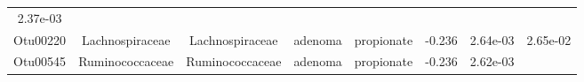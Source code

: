 \documentclass[11pt,]{article}
\begin{document}
\begin{longtable}[]{@{}cccccccc@{}}
\begin{minipage}[t]{0.08\columnwidth}
2.37e-03\strut
\end{minipage}\tabularnewline
\begin{minipage}[t]{0.08\columnwidth}\centering\strut
Otu00220\strut
\end{minipage} & \begin{minipage}[t]{0.15\columnwidth}\centering\strut
Lachnospiraceae\strut
\end{minipage} & \begin{minipage}[t]{0.15\columnwidth}\centering\strut
Lachnospiraceae\strut
\end{minipage} & \begin{minipage}[t]{0.08\columnwidth}\centering\strut
adenoma\strut
\end{minipage} & \begin{minipage}[t]{0.09\columnwidth}\centering\strut
propionate\strut
\end{minipage} & \begin{minipage}[t]{0.07\columnwidth}\centering\strut
-0.236\strut
\end{minipage} & \begin{minipage}[t]{0.08\columnwidth}\centering\strut
2.64e-03\strut
\end{minipage} & \begin{minipage}[t]{0.08\columnwidth}\centering\strut
2.65e-02\strut
\end{minipage}\tabularnewline
\begin{minipage}[t]{0.08\columnwidth}\centering\strut
Otu00545\strut
\end{minipage} & \begin{minipage}[t]{0.15\columnwidth}\centering\strut
Ruminococcaceae\strut
\end{minipage} & \begin{minipage}[t]{0.15\columnwidth}\centering\strut
Ruminococcaceae\strut
\end{minipage} & \begin{minipage}[t]{0.08\columnwidth}\centering\strut
adenoma\strut
\end{minipage} & \begin{minipage}[t]{0.09\columnwidth}\centering\strut
propionate\strut
\end{minipage} & \begin{minipage}[t]{0.07\columnwidth}\centering\strut
-0.236\strut
\end{minipage} & \begin{minipage}[t]{0.08\columnwidth}\centering\strut
2.62e-03\strut
\end{minipage} & \begin{minipage}[t]{0.08\columnwidth}\centering\strut

\end{minipage}
\end{longtable}
\end{document}
